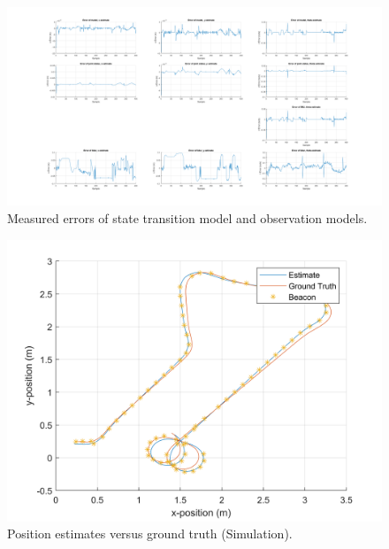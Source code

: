 	\begin{figure}
	    	\captionsetup{width=\columnwidth}
	   	\centering
	   	\includegraphics[width=\columnwidth]{./graphics/errorAbs.png}
	   	\caption{Measured errors of state transition model and observation models.}
		\label{fig:err1}
	\end{figure}
	
	\begin{figure}
	    	\captionsetup{width=\columnwidth}
	   	\centering
	   	\includegraphics[width=\columnwidth]{./graphics/posSimu.png}
	   	\caption{Position estimates versus ground truth (Simulation).}
		\label{fig:pos}
	\end{figure}
	
